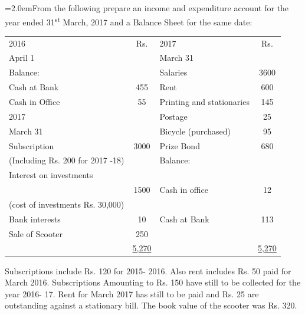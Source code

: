 \documentclass[11pt,a4paper]{article}
\newcommand{\lqn}[2]{\Needspace{6\baselineskip}\par\medskip\noindent\hangindent=2.0em\hangafter=1\makebox[2.0em][l]{\textbf{#1.}}#2\par}
\begin{document}
\lqn{25}{From the following prepare an income and expenditure account for the year ended 31\textsuperscript{st}  March, 2017 and a Balance Sheet for the same date:\par
\par\smallskip\noindent\hspace*{1.2em}\begin{tabular}{|lclc|}
\hline
2016 & Rs. & 2017 & Rs. \\
April 1 &  & March 31 &  \\
Balance: &  & Salaries & 3600 \\
Cash at Bank & 455 & Rent & 600 \\
Cash in Office & 55 & Printing and stationaries & 145 \\
2017 &  & Postage & 25 \\
March 31 &  & Bicycle (purchased) & 95 \\
Subscription & 3000 & Prize Bond & 680 \\
(Including Rs. 200 for 2017 -18) &  & Balance: &  \\
Interest on investments &  &  &  \\
 & 1500 & Cash in office & 12 \\
(cost of investments Rs. 30,000) &  &  &  \\
Bank interests & 10 & Cash at Bank & 113 \\
Sale of Scooter & 250 &  &  \\
 & \underline{5,270} &  & \underline{5,270} \\
\hline
\end{tabular}\par\smallskip
Subscriptions include Rs. 120 for 2015- 2016. Also rent includes Rs. 50 paid for March 2016. Subscriptions Amounting to Rs. 150 have still to be collected for the year 2016- 17. Rent for March 2017 has still to be paid and Rs. 25 are outstanding against a stationary bill. The book value of the scooter was Rs. 320.\par
}
\end{document}

